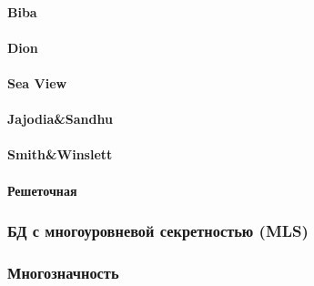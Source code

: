 \paragraph{Biba}
\paragraph{Dion}
\paragraph{Sea View}
\paragraph{Jajodia\&Sandhu}
\paragraph{Smith\&Winslett}
\paragraph{Решеточная}

\subsubsection{БД с многоуровневой секретностью (MLS)}
\subsubsection{Многозначность}